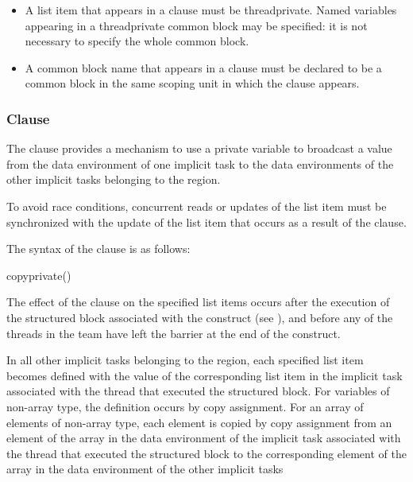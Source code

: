 {{{{\fortranspecificstart
\begin{itemize}
\item A list item that appears in a  clause must be threadprivate. Named variables 
appearing in a threadprivate common block may be specified: it is not necessary to 
specify the whole common block. 

\item A common block name that appears in a  clause must be declared to be a 
common block in the same scoping unit in which the  clause appears.
\end{itemize}
\fortranspecificend









\subsubsection{ Clause}
\label{subsubsec:copyprivate clause}
\summary
The  clause provides a mechanism to use a private variable to broadcast 
a value from the data environment of one implicit task to the data environments of the 
other implicit tasks belonging to the  region.

To avoid race conditions, concurrent reads or updates of the list item must be 
synchronized with the update of the list item that occurs as a result of the 
 clause.

\syntax
The syntax of the  clause is as follows:

\begin{boxedcode}
copyprivate()
\end{boxedcode}

\descr
The effect of the  clause on the specified list items occurs after the 
execution of the structured block associated with the  construct (see 
), 
and before any of the threads in the team have left the barrier 
at the end of the construct.

\ccppspecificstart
In all other implicit tasks belonging to the  region, each specified list item 
becomes defined with the value of the corresponding list item in the implicit task associated with the 
thread that executed the structured block. For variables of non-array type, the definition 
occurs by copy assignment. For an array of elements of non-array type, each element is
copied by copy assignment from an element of the array in the data environment of the 
implicit task associated with the thread that executed the structured block to the 
corresponding element of the array in the data environment of the other implicit tasks
\ccppspecificend

}}}}
